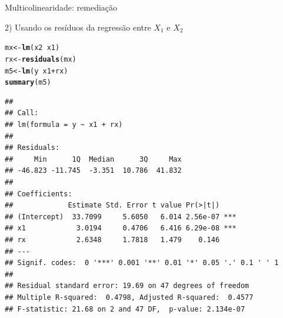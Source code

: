 \documentclass{beamer}\usepackage[]{graphicx}\usepackage[]{color}
\makeatletter
\newcommand{\hlopt}[1]{\textcolor[rgb]{0,0,0}{#1}}%
\newcommand{\hlstd}[1]{\textcolor[rgb]{0.345,0.345,0.345}{#1}}%
\newcommand{\hlkwb}[1]{\textcolor[rgb]{0.69,0.353,0.396}{#1}}%
\newcommand{\hlkwd}[1]{\textcolor[rgb]{0.737,0.353,0.396}{\textbf{#1}}}%
\newenvironment{kframe}{%
 \def\at@end@of@kframe{}%
 \ifinner\ifhmode%
  \def\at@end@of@kframe{\end{minipage}}%
  \begin{minipage}{\columnwidth}%
 \fi\fi%
 \def\FrameCommand##1{\hskip\@totalleftmargin \hskip-\fboxsep
 \colorbox{shadecolor}{##1}\hskip-\fboxsep
     \hskip-\linewidth \hskip-\@totalleftmargin \hskip\columnwidth}%
 \MakeFramed {\advance\hsize-\width
   \@totalleftmargin\z@ \linewidth\hsize
   \@setminipage}}%
 {\par\unskip\endMakeFramed%
 \at@end@of@kframe}
\newenvironment{knitrout}{}{} %
\renewenvironment{knitrout}{\setlength{\topsep}{0mm}}{}
\makeatother
\begin{document}
\begin{frame}[fragile]{Multicolinearidade: remediação}

2) Usando os resíduos da regressão entre $X_1$ e $X_2$

 
\begin{knitrout}\tiny
{}\color{fgcolor}\begin{kframe}
\begin{alltt}
\hlstd{mx} \hlkwb{<-} \hlkwd{lm}\hlstd{(x2} \hlopt{~} \hlstd{x1)}
\hlstd{rx} \hlkwb{<-} \hlkwd{residuals}\hlstd{(mx)}
\hlstd{m5} \hlkwb{<-} \hlkwd{lm}\hlstd{(y} \hlopt{~} \hlstd{x1} \hlopt{+} \hlstd{rx)}
\hlkwd{summary}\hlstd{(m5)}
\end{alltt}
\begin{verbatim}
## 
## Call:
## lm(formula = y ~ x1 + rx)
## 
## Residuals:
##     Min      1Q  Median      3Q     Max 
## -46.823 -11.745  -3.351  10.786  41.832 
## 
## Coefficients:
##             Estimate Std. Error t value Pr(>|t|)    
## (Intercept)  33.7099     5.6050   6.014 2.56e-07 ***
## x1            3.0194     0.4706   6.416 6.29e-08 ***
## rx            2.6348     1.7818   1.479    0.146    
## ---
## Signif. codes:  0 '***' 0.001 '**' 0.01 '*' 0.05 '.' 0.1 ' ' 1
## 
## Residual standard error: 19.69 on 47 degrees of freedom
## Multiple R-squared:  0.4798,	Adjusted R-squared:  0.4577 
## F-statistic: 21.68 on 2 and 47 DF,  p-value: 2.134e-07
\end{verbatim}
\end{kframe}
\end{knitrout}
 

\end{frame}
\end{document}
